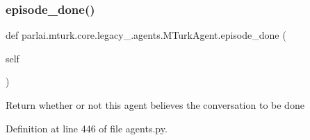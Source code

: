 \subsubsection{\texorpdfstring{episode\+\_\+done()}{episode\_done()}}
{\footnotesize\ttfamily def parlai.\+mturk.\+core.\+legacy\+\_.\+agents.\+M\+Turk\+Agent.\+episode\+\_\+done (\begin{DoxyParamCaption}\item[{}]{self }\end{DoxyParamCaption})}

\begin{DoxyVerb}Return whether or not this agent believes the conversation to
be done\end{DoxyVerb}
 

Definition at line 446 of file agents.\+py.



